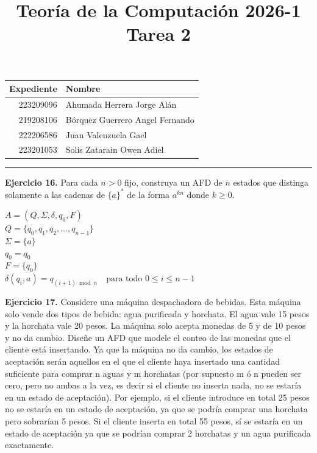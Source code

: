 \documentclass[12pt]{article}
\title
{
    Teoría de la Computación 2026-1 \\
    Tarea 2
}
\begin{document}
    \maketitle

    \begin{center}
        \begin{tabular}{r|l}
            \textbf{Expediente} & \textbf{Nombre} \\ \hline
            223209096 & Ahumada Herrera Jorge Alán \\
            219208106 & Bórquez Guerrero Angel Fernando \\
            222206586 & Juan Valenzuela Gael \\
            223201053 & Solis Zatarain Owen Adiel \\
        \end{tabular}
    \end{center}

    \rule{\linewidth}{0.3mm}

    \vspace{0.3cm}



\textbf{Ejercicio 16.} Para cada $n > 0$ fijo, construya un AFD de $n$ estados que distinga solamente a las cadenas de $\{a\}^*$ de la forma $a^{kn}$ donde $k \ge 0$.

\vspace{1em}

\begin{flushleft}
$A = (Q, \Sigma, \delta, q_0, F)$\\[1em]

$Q = \{q_0, q_1, q_2, \dots, q_{n-1}\}$\\[1em]
    
$\Sigma = \{a\}$\\[1em]
    
$q_0 = q_0$\\[1em]
    
$F = \{q_0\}$\\[1em]
    
$\delta(q_i, a) = q_{(i+1) \bmod n} \quad \text{para todo } 0 \le i \le n-1$
\end{flushleft}



\newpage
\textbf{Ejercicio 17.} Considere una máquina despachadora de bebidas. 
Esta máquina solo vende dos tipos de bebida: agua purificada y horchata. El agua vale 15
pesos y la horchata vale 20 pesos. La máquina solo acepta monedas de 5 y de
10 pesos y no da cambio. Diseñe un AFD que modele el conteo de las monedas
que el cliente está insertando. Ya que la máquina no da cambio, los estados
de aceptación serán aquellos en el que el cliente haya insertado una cantidad
suficiente para comprar n aguas y m horchatas (por supuesto m ó n pueden
ser cero, pero no ambas a la vez, es decir si el cliente no inserta nada, no se
estaría en un estado de aceptación). Por ejemplo, si el cliente introduce en total
25 pesos no se estaría en un estado de aceptación, ya que se podría comprar
una horchata pero sobrarían 5 pesos. Si el cliente inserta en total 55 pesos, sí se
estaría en un estado de aceptación ya que se podrían comprar 2 horchatas y un
agua purificada exactamente. \\
\end{document}
